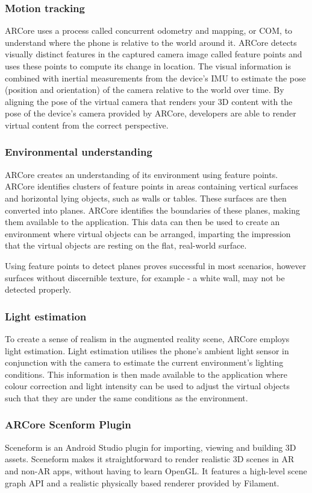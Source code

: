 \subsubsection{Motion tracking}
 ARCore uses a process called concurrent odometry and mapping, or COM, to understand where the phone is relative to the world around it. ARCore detects visually distinct features in the captured camera image called feature points and uses these points to compute its change in location. The visual information is combined with inertial measurements from the device's IMU to estimate the pose (position and orientation) of the camera relative to the world over time. By aligning the pose of the virtual camera that renders your 3D content with the pose of the device's camera provided by ARCore, developers are able to render virtual content from the correct perspective.
 
 \subsubsection{Environmental understanding}
 ARCore creates an understanding of its environment using feature points. ARCore identifies clusters of feature points in areas containing vertical surfaces and horizontal lying objects, such as walls or tables. These surfaces are then converted into planes. ARCore identifies the boundaries of these planes, making them available to the application. This data can then be used to create an environment where virtual objects can be arranged, imparting the impression that the virtual objects are resting on the flat, real-world surface.

Using feature points to detect planes proves successful in most scenarios, however surfaces without discernible texture, for example - a white wall, may not be detected properly.

\subsubsection{Light estimation}
To create a sense of realism in the augmented reality scene, ARCore employs light estimation. Light estimation utilises the phone’s ambient light sensor in conjunction with the camera to estimate the current environment’s lighting conditions. This information is then made available to the application where colour correction and light intensity can be used to adjust the virtual objects such that they are under the same conditions as the environment.

 \subsubsection{ARCore Scenform Plugin}
 Sceneform is an Android Studio plugin for importing, viewing and building 3D assets\cite{sceneform}. Sceneform makes it straightforward to render realistic 3D scenes in AR and non-AR apps, without having to learn OpenGL. It features a high-level scene graph API and a realistic physically based renderer provided by Filament. 

